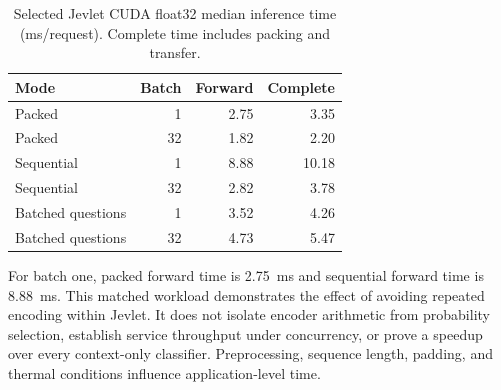 \documentclass[conference]{IEEEtran}
\begin{document}
\begin{table}[t]
\caption{Selected Jevlet CUDA float32 median inference time (ms/request). Complete time includes packing and transfer.}
\label{tab:timing}\centering\footnotesize
\begin{tabular}{lrrr}\toprule
Mode & Batch & Forward & Complete\\\midrule
Packed & 1 & 2.75 & 3.35 \\
Packed & 32 & 1.82 & 2.20 \\
Sequential & 1 & 8.88 & 10.18 \\
Sequential & 32 & 2.82 & 3.78 \\
Batched questions & 1 & 3.52 & 4.26 \\
Batched questions & 32 & 4.73 & 5.47 \\
\bottomrule\end{tabular}\end{table}

For batch one, packed forward time is 2.75~ms and sequential forward time is 8.88~ms. This matched workload demonstrates the effect of avoiding repeated encoding within Jevlet. It does not isolate encoder arithmetic from probability selection, establish service throughput under concurrency, or prove a speedup over every context-only classifier. Preprocessing, sequence length, padding, and thermal conditions influence application-level time.
\end{document}
